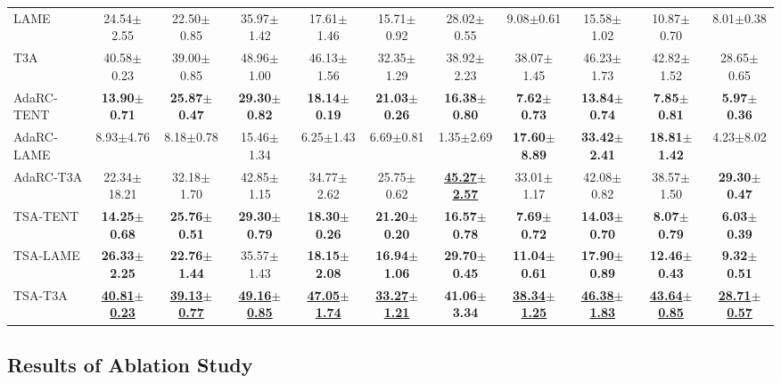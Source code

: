\begin{table}[h]
\begin{center}
{\begin{tabular}{lcccccccccc}
\\
LAME &24.54$\pm$2.55 &22.50$\pm$0.85 &35.97$\pm$1.42 &17.61$\pm$1.46 &15.71$\pm$0.92 &28.02$\pm$0.55 &9.08$\pm$0.61 &15.58$\pm$1.02 &10.87$\pm$0.70 &8.01$\pm$0.38 
\\
T3A &40.58$\pm$0.23 &39.00$\pm$0.85 &48.96$\pm$1.00 &46.13$\pm$1.56 &32.35$\pm$1.29 &38.92$\pm$2.23 &38.07$\pm$1.45 &46.23$\pm$1.73 &42.82$\pm$1.52 &28.65$\pm$0.65 
\\
\midrule
AdaRC-TENT &\textbf{13.90$\pm$0.71} &\textbf{25.87$\pm$0.47} &\textbf{29.30$\pm$0.82} &\textbf{18.14$\pm$0.19} &\textbf{21.03$\pm$0.26} &\textbf{16.38$\pm$0.80} &\textbf{7.62$\pm$0.73} &\textbf{13.84$\pm$0.74} &\textbf{7.85$\pm$0.81} &\textbf{5.97$\pm$0.36}
\\
AdaRC-LAME &8.93$\pm$4.76 &8.18$\pm$0.78 &15.46$\pm$1.34 &6.25$\pm$1.43 &6.69$\pm$0.81 &1.35$\pm$2.69 &\textbf{17.60$\pm$8.89} &\textbf{33.42$\pm$2.41} &\textbf{18.81$\pm$1.42} &4.23$\pm$8.02 
\\
AdaRC-T3A &22.34$\pm$18.21 &32.18$\pm$1.70 &42.85$\pm$1.15 &34.77$\pm$2.62 &25.75$\pm$0.62 &\underline{\textbf{45.27$\pm$2.57}} &33.01$\pm$1.17 &42.08$\pm$0.82 &38.57$\pm$1.50 &\textbf{29.30$\pm$0.47} 
\\
\midrule
TSA-TENT &\textbf{14.25$\pm$0.68} &\textbf{25.76$\pm$0.51} &\textbf{29.30$\pm$0.79} &\textbf{18.30$\pm$0.26} &\textbf{21.20$\pm$0.20} &\textbf{16.57$\pm$0.78} &\textbf{7.69$\pm$0.72} &\textbf{14.03$\pm$0.70} &\textbf{8.07$\pm$0.79} &\textbf{6.03$\pm$0.39}
\\
TSA-LAME &\textbf{26.33$\pm$2.25} &\textbf{22.76$\pm$1.44} &35.57$\pm$1.43 &\textbf{18.15$\pm$2.08} &\textbf{16.94$\pm$1.06} &\textbf{29.70$\pm$0.45} &\textbf{11.04$\pm$0.61} &\textbf{17.90$\pm$0.89} &\textbf{12.46$\pm$0.43} &\textbf{9.32$\pm$0.51}
\\
TSA-T3A &\underline{\textbf{40.81$\pm$0.23}} &\underline{\textbf{39.13$\pm$0.77}} &\underline{\textbf{49.16$\pm$0.85}} &\underline{\textbf{47.05$\pm$1.74}} &\underline{\textbf{33.27$\pm$1.21}} &\textbf{41.06$\pm$3.34} &\underline{\textbf{38.34$\pm$1.25}} &\underline{\textbf{46.38$\pm$1.83}} &\underline{\textbf{43.64$\pm$0.85}} &\underline{\textbf{28.71$\pm$0.57}}
\\
\bottomrule
\end{tabular}
}
\end{center}
\end{table}

\subsection{Results of Ablation Study}

